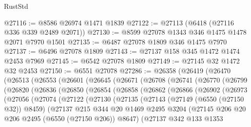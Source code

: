 \begin{lexlean}{RustStd}
\begin{coremodule}
@27116 := @8586 @26974 @1471 @1839
@27122 := @27113 (@6418 (@27116 @336 @339 @2489 @2071))
@27130 := @8599 @27078 @1343 @346 @1475 @1478 @2071 @7970 @1501
@27135 := @6487 @27078 @1809 @346 @1475 @7970
@27137 := @6496 @27078 @1809
@27143 := @27137 @158 @345 @1472 @1474 @2453 @7969
@27145 := @6542 @27078 @1809
@27149 := @27145 @32 @1472 @32 @2453
@27150 := @6551 @27078
@27286 := @26358
    (@26419
      (@26470
        (@26513
          (@26553
            (@26601
              (@26645
                (@26671
                  (@26708
                    (@26741
                      (@26770
                        (@26799
                          (@26820
                            (@26836
                              (@26850
                                (@26854
                                  (@26858
                                    (@26862
                                      (@26866
                                        (@26902
                                          (@26973
                                            (@27056
                                              (@27074
                                                (@27122
                                                  (@27130
                                                    (@27135
                                                      (@27143
                                                        (@27149 (@6550 (@27150 @32)) @8459)
                                                        (@27137
                                                          @215
                                                          @344
                                                          @20
                                                          @1469
                                                          @2495
                                                          @3204
                                                          (@27145
                                                            @206
                                                            @20
                                                            @206
                                                            @2495
                                                            (@6550 (@27150 @206))
                                                            @8647)
                                                          (@27137
                                                            @342
                                                            @133
                                                            @1353

\end{coremodule}
\end{lexlean}
